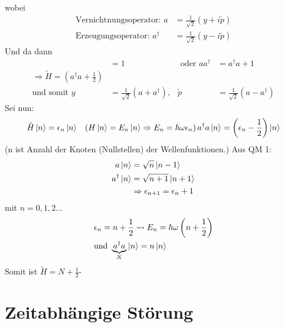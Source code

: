	wobei 
		\begin{align*}
			\text{Vernichtnungsoperator:~} a &= \frac{1}{\sqrt{2}} 
			\left( y + i \tilde{p} \right) \\
			\text{Erzeugungsoperator:~} a^\dagger &= \frac{1}{\sqrt{2}} 
			\left( y - i \tilde{p} \right)
		\end{align*}
	Und da dann
		\begin{align*}
			[a , a^\dagger] &= 1 &\text{~oder~} a a^\dagger &= a^\dagger a + 1 \\
			\Rightarrow \tilde{H} = \left( a^\dagger a + \frac{1}{2} \right)& \\
			\text{und somit~} 
			y &= \frac{1}{\sqrt{2}} \left( a + a^\dagger \right),& 
			\tilde{p} &= \frac{1}{\sqrt{2}} \left( a - a^\dagger \right)
		\end{align*}
	Sei nun:
		\begin{align*}
			\tilde{H} \ket{n} &= \epsilon_n \ket{n} &\left( H \ket{n} = E_n \ket{n} 
			\Rightarrow E_n = \hbar \omega \epsilon_n \right)
			a^\dagger a \ket{n} = \left( \epsilon_n - \frac{1}{2} \right) \ket{n}
		\end{align*}
	(n ist Anzahl der Knoten (Nullstellen) der Wellenfunktionen.)
	Aus QM 1:
		\begin{align*}
			a \ket{n} &= \sqrt{n} \ket{n-1} \\
			a^\dagger \ket {n} &= \sqrt{n+1} \ket{n+1} \\
			&\Rightarrow \epsilon_{n+1} = \epsilon_n + 1
		\end{align*}
	mit $n = 0, 1, 2 \ldots$ 
		\begin{align*}
			&\epsilon_n = n + \frac{1}{2} \leadsto E_n = \hbar \omega \left(n + \frac{1}{2} \right) \\
			&\text{und~} \underbrace{a^\dagger a}_{\substack{N}}
			\ket{n} = n \ket{n}
		\end{align*} %
	Somit ist $\tilde{H} = N + \frac{1}{2}$-
	
\section{Zeitabhängige Störung}
